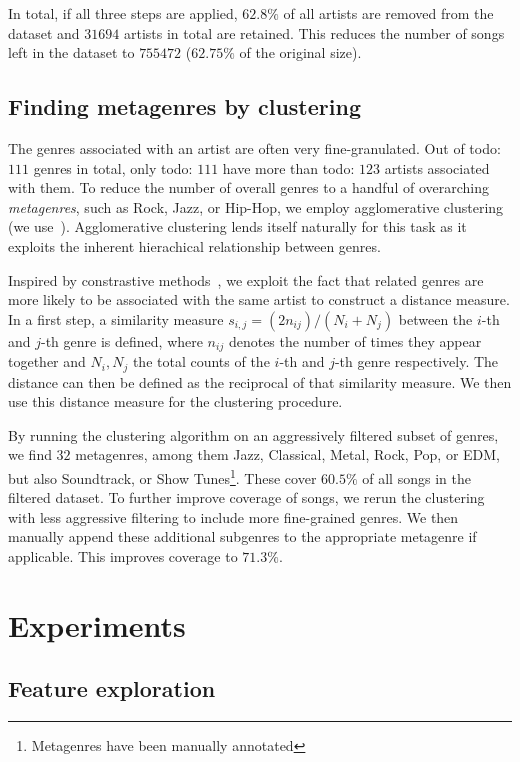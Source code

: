 \documentclass{article}
\newcommand{\todo}[1]{{\color{red}todo: #1}}
\begin{document}
In total, if all three steps are applied, $62.8\%$ of all artists are removed from the dataset and $31694$ artists in total are retained. This reduces the number of songs left in the dataset to $755472$ ($62.75\%$ of the original size).

\subsection{Finding metagenres by clustering}
\label{sec:genre_clustering}
The genres associated with an artist are often very fine-granulated. Out of \todo{$111$} genres in total, only \todo{$111$} have more than \todo{$123$} artists associated with them. To reduce the number of overall genres to a handful of overarching \emph{metagenres}, such as Rock, Jazz, or Hip-Hop, we employ agglomerative clustering~\cite{ward1963hierarchical} (we use~\cite{scikit-learn}). Agglomerative clustering lends itself naturally for this task as it exploits the inherent hierachical relationship between genres.

Inspired by constrastive methods~\cite{mikolov2013efficient, chen2020simple}, we exploit the fact that related genres are more likely to be associated with the same artist to construct a distance measure. In a first step, a similarity measure $s_{i, j} = (2 n_{ij}) / (N_i + N_j)$ between the $i$-th and $j$-th genre is defined, where $n_{ij}$ denotes the number of times they appear together and $N_i, N_j$ the total counts of the $i$-th and $j$-th genre respectively. The distance can then be defined as the reciprocal of that similarity measure. We then use this distance measure for the clustering procedure.

By running the clustering algorithm on an aggressively filtered subset of genres, we find $32$ metagenres, among them Jazz, Classical, Metal, Rock, Pop, or EDM, but also Soundtrack, or Show Tunes\footnote{Metagenres have been manually annotated}. These cover $60.5\%$ of all songs in the filtered dataset. To further improve coverage of songs, we rerun the clustering with less aggressive filtering to include more fine-grained genres. We then manually append these additional subgenres to the appropriate metagenre if applicable. This improves coverage to $71.3\%$.

\section{Experiments}

\subsection{Feature exploration}
\end{document}
